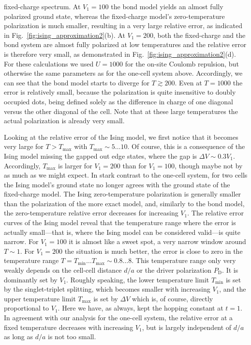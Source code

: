 fixed-charge spectrum. At $V_1 = 100$ the bond model yields an almost fully
polarized ground state, whereas the fixed-charge model's zero-temperature
polarization is much smaller, resulting in a very large relative error, as
indicated in Fig.~\ref{fig:ising_approximation2}(b). At $V_1 = 200$, both the
fixed-charge and the bond system are almost fully polarized at low temperatures
and the relative error is therefore very small, as demonstrated in
Fig.~\ref{fig:ising_approximation2}(d). For these calculations we used $U=1000$
for the on-site Coulomb repulsion, but otherwise the same parameters as for the
one-cell system above. Accordingly, we can see that the bond model starts to
diverge for $T \gtrsim 200$. Even at $T=1000$ the error is relatively small,
because the polarization is quite insensitive to doubly occupied dots, being
defined solely as the difference in charge of one diagonal versus the other
diagonal of the cell. Note that at these large temperatures the actual
polarization is already very small.

Looking at the relative error of the Ising model, we first notice that it
becomes very large for $T > T_{\textrm{max}}$ with $T_{\textrm{max}} \sim 5
\ldots 10$. Of course, this is a consequence of the Ising model missing the
gapped out edge states, where the gap is $\Delta V \sim 0.3 V_1$. Accordingly,
$T_{\textrm{max}}$ is larger for $V_1 = 200$ than for $V_1 = 100$, though maybe
not by as much as we might expect. In stark contrast to the one-cell system, for
two cells the Ising model's ground state no longer agrees with the ground state
of the fixed-charge model. The Ising zero-temperature polarization is generally
smaller than the polarization of the more exact model, and, similarly to the
bond model, the zero-temperature relative error decreases for increasing $V_1$.
The relative error curves of the Ising model reveal that the temperature range
where the error is actually small---that is, where the Ising model can be
considered valid---is quite narrow. For $V_1 = 100$ it is almost like a sweet
spot, a very narrow window around $T \sim 1$. For $V_1 = 200$ the situation is
much better, the error is close to zero in the temperature range $T =
T_{\textrm{min}} \ldots T_{\textrm{max}} \sim 0.8 \ldots 8$. This temperature
range only very weakly depends on the cell-cell distance $d/a$ or the driver
polarization $P_\text{D}$. It is dominantly set by $V_1$. Roughly speaking, the lower
temperature limit $T_{\textrm{min}}$ is set by the singlet-triplet splitting,
which becomes smaller with increasing $V_1$, and the upper temperature limit
$T_{\textrm{max}}$ is set by $\Delta V$ which is, of course, directly
proportional to $V_1$. Here we have, as always, kept the hopping constant at
$t=1$. In agreement with our analysis for the one-cell system, the relative
error at a fixed temperature decreases with increasing $V_1$, but is largely
independent of $d/a$ as long as $d/a$ is not too small.

